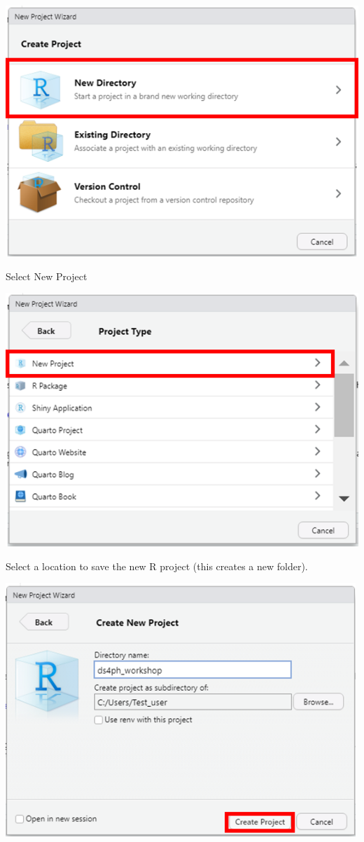 \documentclass[
  letterpaper,
  DIV=11,
  numbers=noendperiod]{scrreprt}
\begin{document}
\includegraphics{./images/paste-DCC39BB5.png}

Select New Project

\includegraphics{./images/paste-30A4402B.png}

Select a location to save the new R project (this creates a new folder).

\includegraphics[width=5.20833in,height=\textheight]{./images/paste-C05F97BD.png}
\end{document}

